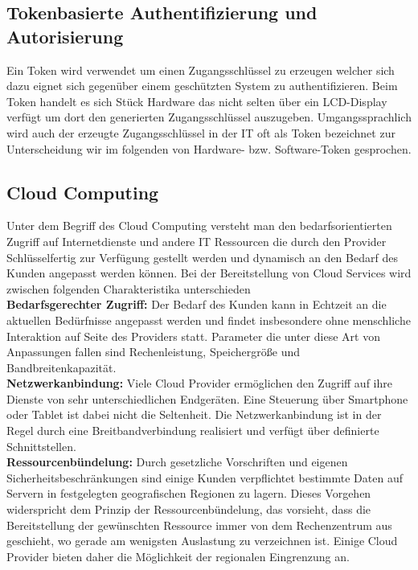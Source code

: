 \documentclass[
book,
a4paper,   
titlepage,  
halfparskip,
12pt        
]{scrartcl}
\begin{document}
\begin{onehalfspacing}
\subsection{Tokenbasierte Authentifizierung und Autorisierung}
\label{subsec:token}
Ein Token wird verwendet um einen Zugangsschlüssel zu erzeugen welcher sich dazu eignet sich gegenüber einem geschützten System zu authentifizieren. Beim Token handelt es sich Stück Hardware das nicht selten über ein LCD-Display verfügt um dort den generierten Zugangsschlüssel auszugeben. Umgangssprachlich wird auch der erzeugte Zugangsschlüssel in der \ac{IT} oft als Token bezeichnet zur Unterscheidung wir im folgenden von Hardware- bzw. Software-Token gesprochen. 

\cite[S.141ff]{kerberos2}

\subsection{Cloud Computing}
\label{subsec:cloud}
Unter dem Begriff des Cloud Computing versteht man den bedarfsorientierten Zugriff auf Internetdienste und andere \ac{IT} Ressourcen die durch den Provider Schlüsselfertig zur Verfügung gestellt werden und dynamisch an den Bedarf des Kunden angepasst werden können. Bei der Bereitstellung von Cloud Services wird zwischen folgenden Charakteristika unterschieden\cite[S. 8]{cloudsec}\\
\textbf{Bedarfsgerechter Zugriff:} Der Bedarf des Kunden kann in Echtzeit an die aktuellen Bedürfnisse angepasst werden und findet insbesondere ohne menschliche Interaktion auf Seite des Providers statt. Parameter die unter diese Art von Anpassungen fallen sind Rechenleistung, Speichergröße und Bandbreitenkapazität.\cite[S. 8]{cloudsec}\\
\textbf{Netzwerkanbindung:}  Viele Cloud Provider ermöglichen den Zugriff auf ihre Dienste von sehr unterschiedlichen Endgeräten. Eine Steuerung über Smartphone oder Tablet ist dabei nicht die Seltenheit. Die Netzwerkanbindung ist in der Regel durch eine Breitbandverbindung realisiert und verfügt über definierte Schnittstellen.\cite[S. 8]{cloudsec}\\
\textbf{Ressourcenbündelung:} Durch gesetzliche Vorschriften und eigenen Sicherheitsbeschränkungen sind einige Kunden verpflichtet bestimmte Daten auf Servern in festgelegten geografischen Regionen zu lagern. Dieses Vorgehen widerspricht dem Prinzip der Ressourcenbündelung, das vorsieht, dass die Bereitstellung der gewünschten Ressource immer von dem Rechenzentrum aus geschieht, wo gerade am wenigsten Auslastung zu verzeichnen ist. Einige Cloud Provider bieten daher die Möglichkeit der regionalen Eingrenzung an.\cite[S. 8]{cloudsec}\\

\end{onehalfspacing}
\end{document}
